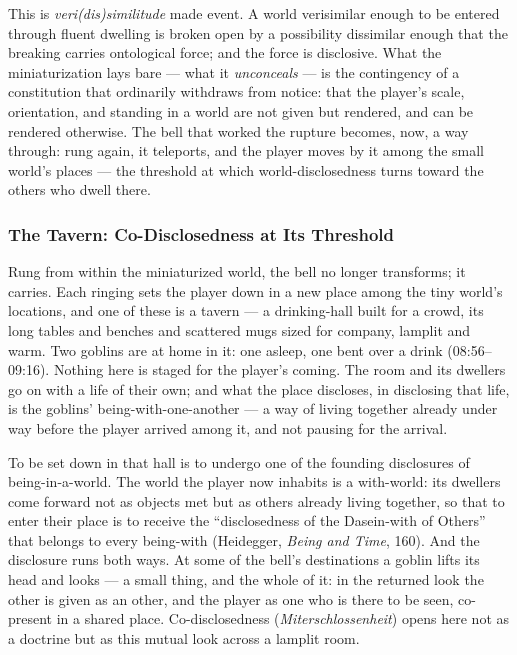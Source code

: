 \documentclass{article}
\begin{document}
This is \textit{veri(dis)similitude} made event. A world verisimilar enough to be entered through fluent dwelling is broken open by a possibility dissimilar enough that the breaking carries ontological force; and the force is disclosive. What the miniaturization lays bare — what it \textit{unconceals} — is the contingency of a constitution that ordinarily withdraws from notice: that the player's scale, orientation, and standing in a world are not given but rendered, and can be rendered otherwise. The bell that worked the rupture becomes, now, a way through: rung again, it teleports, and the player moves by it among the small world's places — the threshold at which world-disclosedness turns toward the others who dwell there.

\subsubsection*{The Tavern: Co-Disclosedness at Its Threshold}

Rung from within the miniaturized world, the bell no longer transforms; it carries. Each ringing sets the player down in a new place among the tiny world's locations, and one of these is a tavern — a drinking-hall built for a crowd, its long tables and benches and scattered mugs sized for company, lamplit and warm. Two goblins are at home in it: one asleep, one bent over a drink (08:56–09:16). Nothing here is staged for the player's coming. The room and its dwellers go on with a life of their own; and what the place discloses, in disclosing that life, is the goblins' being-with-one-another — a way of living together already under way before the player arrived among it, and not pausing for the arrival.

To be set down in that hall is to undergo one of the founding disclosures of being-in-a-world. The world the player now inhabits is a with-world: its dwellers come forward not as objects met but as others already living together, so that to enter their place is to receive the ``disclosedness of the Dasein-with of Others'' that belongs to every being-with (Heidegger, \textit{Being and Time}, 160). And the disclosure runs both ways. At some of the bell's destinations a goblin lifts its head and looks — a small thing, and the whole of it: in the returned look the other is given as an other, and the player as one who is there to be seen, co-present in a shared place. Co-disclosedness (\textit{Miterschlossenheit}) opens here not as a doctrine but as this mutual look across a lamplit room.
\end{document}
